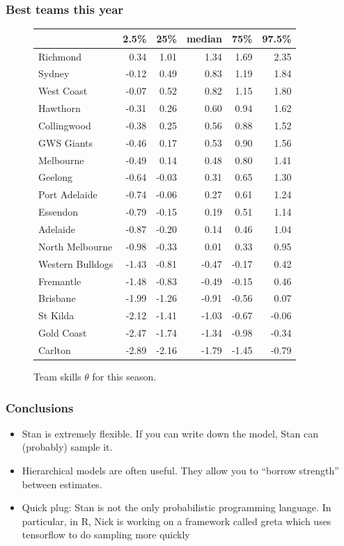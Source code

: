 \documentclass{beamer}
\begin{document}
\begin{frame}
	\frametitle{Best teams this year}
	\begin{figure}
	\tiny
	\begin{tabular}{lrrrrr}
\toprule
{} &  2.5\% &   25\% &  median &   75\% &  97.5\% \\
\midrule
Richmond         &  0.34 &  1.01 &    1.34 &  1.69 &   2.35 \\
Sydney           & -0.12 &  0.49 &    0.83 &  1.19 &   1.84 \\
West Coast       & -0.07 &  0.52 &    0.82 &  1.15 &   1.80 \\
Hawthorn         & -0.31 &  0.26 &    0.60 &  0.94 &   1.62 \\
Collingwood      & -0.38 &  0.25 &    0.56 &  0.88 &   1.52 \\
GWS Giants       & -0.46 &  0.17 &    0.53 &  0.90 &   1.56 \\
Melbourne        & -0.49 &  0.14 &    0.48 &  0.80 &   1.41 \\
Geelong          & -0.64 & -0.03 &    0.31 &  0.65 &   1.30 \\
Port Adelaide    & -0.74 & -0.06 &    0.27 &  0.61 &   1.24 \\
Essendon         & -0.79 & -0.15 &    0.19 &  0.51 &   1.14 \\
Adelaide         & -0.87 & -0.20 &    0.14 &  0.46 &   1.04 \\
North Melbourne  & -0.98 & -0.33 &    0.01 &  0.33 &   0.95 \\
Western Bulldogs & -1.43 & -0.81 &   -0.47 & -0.17 &   0.42 \\
Fremantle        & -1.48 & -0.83 &   -0.49 & -0.15 &   0.46 \\
Brisbane         & -1.99 & -1.26 &   -0.91 & -0.56 &   0.07 \\
St Kilda         & -2.12 & -1.41 &   -1.03 & -0.67 &  -0.06 \\
Gold Coast       & -2.47 & -1.74 &   -1.34 & -0.98 &  -0.34 \\
Carlton          & -2.89 & -2.16 &   -1.79 & -1.45 &  -0.79 \\
\bottomrule
\end{tabular}	
\caption{Team skills $\theta$ for this season.}
\end{figure}
\end{frame}

\begin{frame}
\frametitle{Conclusions}
\begin{itemize}
	\item Stan is extremely flexible. If you can write down the model, Stan can (probably) sample it.
	\item Hierarchical models are often useful. They allow you to ``borrow strength'' between estimates.
	\item Quick plug: Stan is not the only probabilistic programming language. In particular, in R, Nick is working on a framework called greta which uses tensorflow to do sampling more quickly
\end{itemize}
\end{frame}
\end{document}
